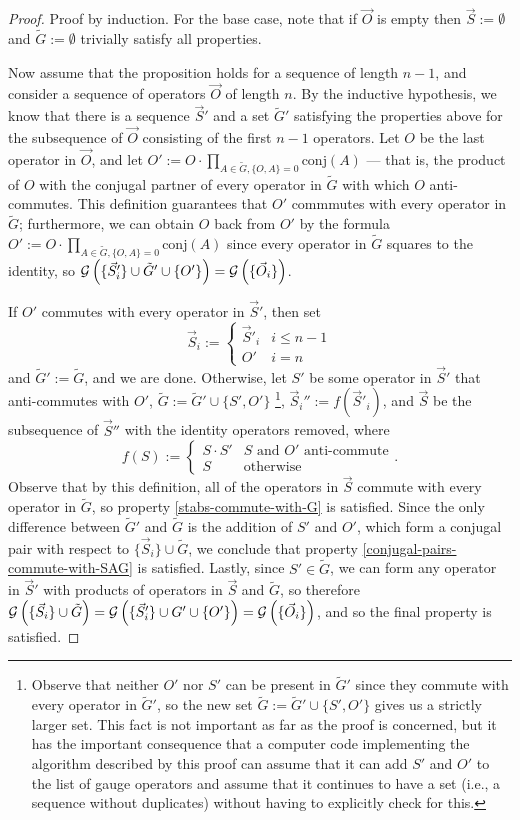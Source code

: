 \documentclass[twocolumn,showpacs,preprintnumbers,amsmath,amssymb,nofootinbib,pra,floatfix]{revtex4}
\newcommand{\lst}{\vec}
\newcommand{\set}{\tilde}
\newcommand{\genfun}{\mathcal{G}}
\begin{document}
\begin{proof}
Proof by induction.  For the base case, note that if $\lst O$ is empty then $\lst S:=\emptyset$ and $\set G:=\emptyset$ trivially satisfy all properties.

Now assume that the proposition holds for a sequence of length $n-1$, and consider a sequence of operators $\lst O$ of length $n$.  By the inductive hypothesis, we know that there is a sequence $\lst S'$ and a set $\set G'$ satisfying the properties above for the subsequence of $\lst O$ consisting of the first $n-1$ operators.  Let $O$ be the last operator in $\lst O$, and let $O':=O\cdot \prod_{A\in \set G, \{O,A\}=0} \text{conj}(A)$ --- that is, the product of $O$ with the conjugal partner of every operator in $\set G$ with which $O$ anti-commutes.  This definition guarantees that $O'$ commmutes with every operator in $\set G$;  furthermore, we can obtain $O$ back from $O'$ by the formula $O':=O\cdot \prod_{A\in \set G, \{O,A\}=0} \text{conj}(A)$ since every operator in $\set G$ squares to the identity, so $\genfun\paren{\{\lst S'_i\} \cup \set G' \cup \{O'\}}=\genfun\paren{\{\lst O_i\}}$.

If $O'$ commutes with every operator in $\lst S'$, then set
$$\lst S_i :=
\begin{cases}
\lst S'_i & i \le n-1 \\
O' & i = n
\end{cases}
$$
and $\set G' := \set G$, and we are done.  Otherwise, let $S'$ be some operator in $\lst S'$ that anti-commutes with $O'$, $\set G:=\set G'\cup \{S',O'\}$
\footnote{Observe that neither $O'$ nor $S'$ can be present in $\set G'$ since they commute with every operator in $\set G'$, so the new set $\set G:=\set G'\cup \{S',O'\}$ gives us a strictly larger set.  This fact is not important as far as the proof is concerned, but it has the important consequence that a computer code implementing the algorithm described by this proof can assume that it can add $S'$ and $O'$ to the list of gauge operators and assume that it continues to have a set (i.e., a sequence without duplicates) without having to explicitly check for this.}, $\lst S_i'' := f(\lst S'_i)$, and $\lst S$ be the subsequence of $\lst S''$ with the identity operators removed, where
$$
f(S) :=
\begin{cases}
S\cdot S' & \text{$S$ and $O'$ anti-commute}\\
S & \text{otherwise}
\end{cases}.
$$
Observe that by this definition, all of the operators in $\lst S$ commute with every operator in $\set G$, so property \ref{stabs-commute-with-G} is satisfied.  Since the only difference between $\set G'$ and $\set G$ is the addition of $S'$ and $O'$, which form a conjugal pair with respect to $\{\lst S_i\} \cup \set G$, we conclude that property \ref{conjugal-pairs-commute-with-SAG} is satisfied.
Lastly, since $S'\in \set G$, we can form any operator in $\lst S'$ with products of operators in $\lst S$ and $\set G$, so therefore $\genfun\paren{\{\lst S_i\} \cup \set G}=\genfun\paren{\{\lst S'_i\} \cup G' \cup \{O'\}}=\genfun\paren{\{\lst O_i\}}$, and so the final property is satisfied.


\end{proof}
\end{document}
